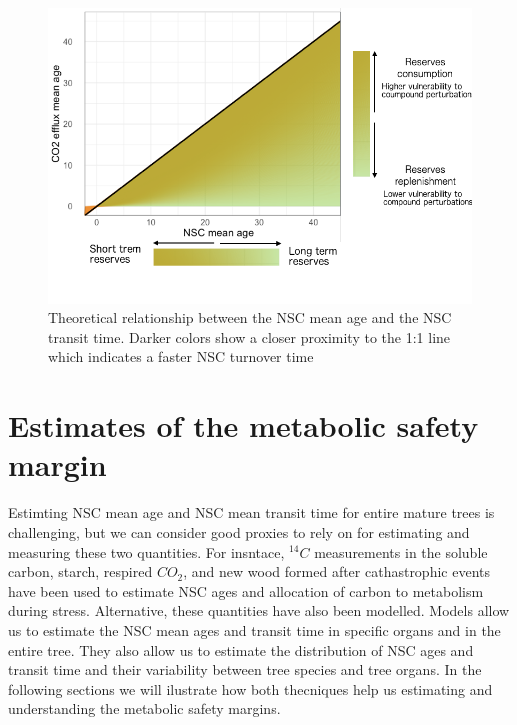 \documentclass{article}
\begin{document}
 \begin{figure}[h] %
   \centering
   \includegraphics[width=5in]{NCSage_CO2age.png} 
   \caption{Theoretical relationship between the NSC mean age and the NSC transit time. Darker colors show a closer proximity to the 1:1 line which indicates a faster NSC turnover time}
   \label{fig:NCSage_CO2age}
\end{figure}


 

\section{Estimates of the metabolic safety margin}

Estimting NSC mean age and NSC mean transit time for entire mature trees is challenging, but we can consider good proxies to rely on for estimating and measuring these two quantities. 
For insntace,  $^{14}C$ measurements in the soluble carbon, starch, respired $CO_{2}$, and new wood formed after cathastrophic events have been used to estimate NSC ages and allocation of carbon to metabolism during stress. 
Alternative, these quantities have also been modelled. 
Models allow us to estimate the NSC mean ages and transit time in specific organs and in the entire tree.
They also allow us to estimate the distribution of NSC ages and transit time and their variability between tree species and tree organs. 
In the following sections we will ilustrate how both thecniques help us estimating and understanding the metabolic safety margins. 
\end{document}
